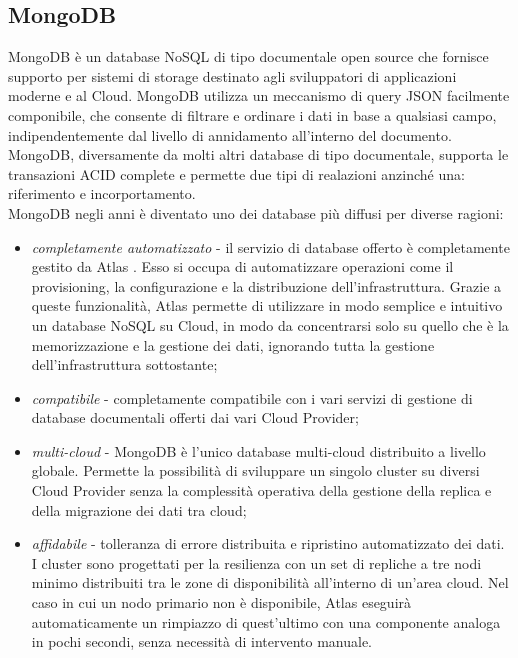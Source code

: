\subsection{MongoDB}
MongoDB \cite{mongodb} è un database NoSQL di tipo documentale open source che fornisce supporto per sistemi di storage destinato agli sviluppatori di applicazioni moderne e al Cloud. MongoDB utilizza un meccanismo di query JSON facilmente componibile, che consente di filtrare e ordinare i dati in base a qualsiasi campo, indipendentemente dal livello di annidamento all'interno del documento. \\
MongoDB, diversamente da molti altri database di tipo documentale, supporta le transazioni ACID complete e permette due tipi di realazioni anzinché una: riferimento e incorportamento. \\
MongoDB negli anni è diventato uno dei database più diffusi per diverse ragioni:
\begin{itemize}
    \item \textit{completamente automatizzato} - il servizio di database offerto è completamente gestito da Atlas \cite{atlas}. Esso si occupa di automatizzare operazioni come il provisioning, la configurazione e la distribuzione dell'infrastruttura. Grazie a queste funzionalità, Atlas permette di utilizzare in modo semplice e intuitivo un database NoSQL su Cloud, in modo da concentrarsi solo su quello che è la memorizzazione e la gestione dei dati, ignorando tutta la gestione dell'infrastruttura sottostante;
    \item \textit{compatibile} - completamente compatibile con i vari servizi di gestione di database documentali offerti dai vari Cloud Provider;
    \item \textit{multi-cloud} - MongoDB è l'unico database multi-cloud distribuito a livello globale. Permette la possibilità di sviluppare un singolo cluster su diversi Cloud Provider senza la complessità operativa della gestione della replica e della migrazione dei dati tra cloud;
    \item \textit{affidabile} - tolleranza di errore distribuita e ripristino automatizzato dei dati. I cluster sono progettati per la resilienza con un set di repliche a tre nodi minimo distribuiti tra le zone di disponibilità all'interno di un'area cloud. Nel caso in cui un nodo primario non è disponibile, Atlas eseguirà automaticamente un rimpiazzo di quest'ultimo con una componente analoga in pochi secondi, senza necessità di intervento manuale.
\end{itemize}

